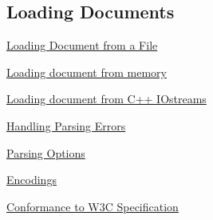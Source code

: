  \par
 \hypertarget{XMLManual_XMLLoading}{}\subsection{Loading Documents}\label{XMLManual_XMLLoading}

\begin{DoxyItemize}
\item \hyperlink{XMLManual_XMLLoadingFiles}{Loading Document from a File}
\item \hyperlink{XMLManual_XMLLoadingFromMemory}{Loading document from memory}
\item \hyperlink{XMLManual_XMLLoadingStreams}{Loading document from C++ IOstreams}
\item \hyperlink{XMLManual_XMLLoadingErrors}{Handling Parsing Errors}
\item \hyperlink{XMLManual_XMLLoadingParsingOptions}{Parsing Options}
\item \hyperlink{XMLManual_XMLLoadingEncodings}{Encodings}
\item \hyperlink{XMLManual_XMLLoadingStandards}{Conformance to W3C Specification}
\end{DoxyItemize}


